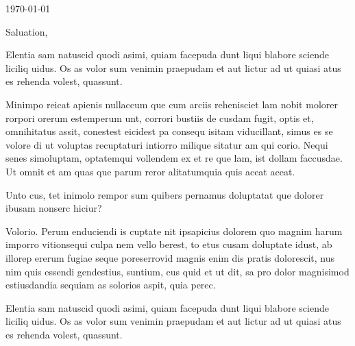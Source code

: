 \documentclass[
]{ImperialLetterhead}
\begin{document}


\today %


\bigskip %

Saluation,

Elentia sam natuscid quodi asimi, quiam facepuda dunt liqui blabore sciende liciliq uidus. Os as volor sum venimin praepudam et aut lictur ad ut quiasi atus es rehenda volest, quassunt.

Minimpo reicat apienis nullaccum que cum arciis rehenisciet lam nobit molorer rorpori orerum estemperum unt, corrori bustiis de cusdam fugit, optis et, omnihitatus assit, conestest eicidest pa consequ isitam viducillant, simus es se volore di ut voluptas recuptaturi intiorro milique sitatur am qui corio. Nequi senes simoluptam, optatemqui vollendem ex et re que lam, ist dollam faccusdae. Ut omnit et am quas que parum reror alitatumquia quis aceat aceat.

Unto cus, tet inimolo rempor sum quibers pernamus doluptatat que dolorer ibusam nonserc hiciur?

Volorio. Perum enduciendi is cuptate nit ipsapicius dolorem quo magnim harum imporro vitionsequi culpa nem vello berest, to etus cusam doluptate idust, ab illorep ererum fugiae seque poreserrovid magnis enim dis pratis dolorescit, nus nim quis essendi gendestius, suntium, cus quid et ut dit, sa pro dolor magnisimod estiusdandia sequiam as solorios aspit, quia perec.

Elentia sam natuscid quodi asimi, quiam facepuda dunt liqui blabore sciende liciliq uidus. Os as volor sum venimin praepudam et aut lictur ad ut quiasi atus es rehenda volest, quassunt.
\end{document}
